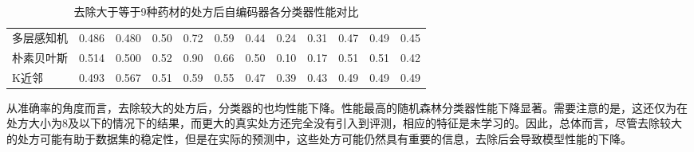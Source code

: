 \begin{table}[htbp]
{\begin{tabular}{lccccccccccc}
      多层感知机               & 0.486                & 0.480                & 0.50                    & 0.72                    & 0.59                      & 0.44 & 0.24 & 0.31 & 0.47 & 0.49 & 0.45 \\
      朴素贝叶斯               & 0.514                & 0.500                & 0.52                    & 0.90                    & 0.66                      & 0.50 & 0.10 & 0.17 & 0.51 & 0.51 & 0.42 \\
      K近邻                 & 0.493                & 0.567                & 0.51                    & 0.59                    & 0.55                      & 0.47 & 0.39 & 0.43 & 0.49 & 0.49 & 0.49 \\
      \bottomrule
    \end{tabular}
  }
  \caption{去除大于等于9种药材的处方后自编码器各分类器性能对比}
  \label{tab:reduced_performance_comparison}
\end{table}

从准确率的角度而言，去除较大的处方后，分类器的也均性能下降。性能最高的随机森林分类器性能下降显著。需要注意的是，这还仅为在处方大小为8及以下的情况下的结果，而更大的真实处方还完全没有引入到评测，相应的特征是未学习的。因此，总体而言，尽管去除较大的处方可能有助于数据集的稳定性，但是在实际的预测中，这些处方可能仍然具有重要的信息，去除后会导致模型性能的下降。